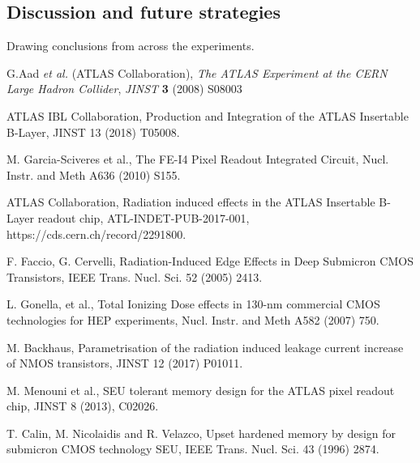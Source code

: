 \subsection{Discussion and future strategies}
\label{sec:electronics-conclusions}
Drawing conclusions from across the experiments. 


\begin{thebibliography}{99}
G.Aad \emph{et al.} (ATLAS Collaboration), \emph{The ATLAS Experiment at the CERN Large Hadron Collider}, \emph{JINST} {\bf 3} (2008) S08003

 ATLAS IBL Collaboration, Production and Integration of the ATLAS Insertable B-Layer, JINST 13 (2018) T05008.

 M. Garcia-Sciveres et al., The FE-I4 Pixel Readout Integrated Circuit, Nucl. Instr. and Meth A636 (2010) S155. 

 ATLAS Collaboration, Radiation induced effects in the ATLAS Insertable B-Layer readout chip, ATL-INDET-PUB-2017-001, https://cds.cern.ch/record/2291800.

 F. Faccio, G. Cervelli, Radiation-Induced Edge Effects in Deep Submicron CMOS Transistors, IEEE Trans. Nucl. Sci. 52 (2005) 2413. 

 L. Gonella, et al., Total Ionizing Dose effects in 130-nm commercial CMOS technologies for HEP experiments, Nucl. Instr. and Meth A582 (2007) 750.

 M. Backhaus, Parametrisation of the radiation induced leakage current increase of NMOS transistors,  JINST 12 (2017) P01011.

 M. Menouni et al., SEU tolerant memory design for the ATLAS pixel readout chip, JINST 8 (2013), C02026.

 T. Calin, M. Nicolaidis and R. Velazco, Upset hardened memory by design for submicron CMOS technology SEU, IEEE Trans. Nucl. Sci. 43 (1996) 2874.



\end{thebibliography}
